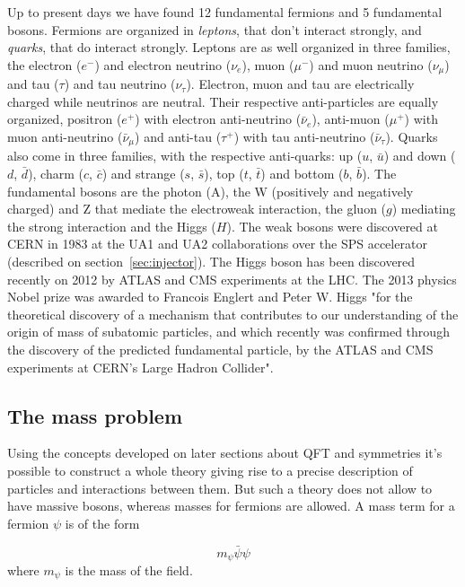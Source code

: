Up to present days we have found 12 fundamental fermions and 5 fundamental bosons. Fermions are organized in \textit{leptons}, that don't interact strongly, and \textit{quarks}, that do interact strongly. Leptons are as well organized in three families, the electron ($e^{-}$) and electron neutrino ($\nu_{e}$), muon ($\mu^{-}$) and muon neutrino ($\nu_{\mu}$) and tau ($\tau$) and tau neutrino ($\nu_{\tau}$). Electron, muon and tau are electrically charged while neutrinos are neutral. Their respective anti-particles are equally organized, positron ($e^{+}$) with electron anti-neutrino ($\bar{\nu}_{e}$), anti-muon ($\mu^{+}$) with muon anti-neutrino ($\bar{\nu}_{\mu}$) and anti-tau ($\tau^{+}$) with tau anti-neutrino ($\bar{\nu}_{\tau}$). Quarks also come in three families, with the respective anti-quarks: up ($u$, $\bar{u}$) and down ($d$, $\bar{d}$), charm ($c$, $\bar{c}$) and strange ($s$, $\bar{s}$), top ($t$, $\bar{t}$) and bottom ($b$, $\bar{b}$). The fundamental bosons are the photon (A), the W (positively and negatively charged) and Z that mediate the electroweak interaction, the gluon ($g$) mediating the strong interaction and the Higgs ($H$). The weak bosons were discovered at CERN in 1983 at the UA1 and UA2 collaborations over the SPS accelerator (described on section~\ref{sec:injector}). The Higgs boson has been discovered recently on 2012 by ATLAS and CMS experiments at the LHC. The 2013 physics Nobel prize was awarded to Francois Englert and Peter W. Higgs "for the theoretical discovery of a mechanism that contributes to our understanding of the origin of mass of subatomic particles, and which recently was confirmed through the discovery of the predicted fundamental particle, by the ATLAS and CMS experiments at CERN's Large Hadron Collider".

\subsection{The mass problem}
\label{sec:mass}

Using the concepts developed on later sections about QFT and symmetries it's possible to construct a whole theory giving rise to a precise description of particles and interactions between them. But such a theory does not allow to have massive bosons, whereas masses for fermions are allowed. A mass term for a fermion $\psi$ is of the form 

\begin{equation*}
  m_{\psi}\bar{\psi}\psi
\end{equation*} where $m_{\psi}$ is the mass of the field.

